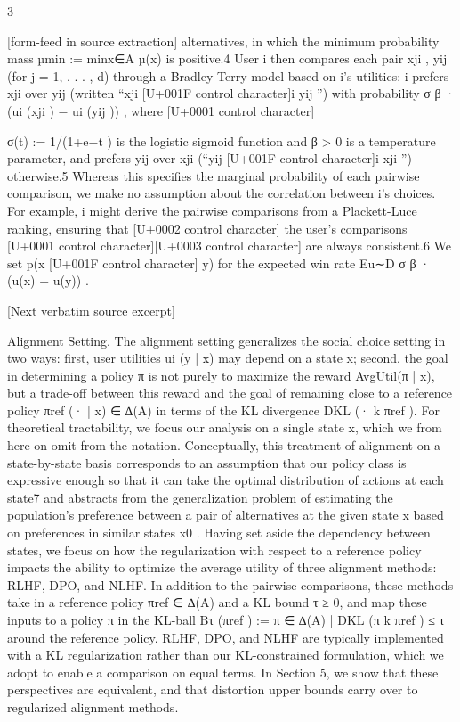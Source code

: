\documentclass[10pt]{article}
\begin{document}
\begin{ReviewVerbatim}
                                                           3

[form-feed in source extraction]
alternatives, in which the minimum probability mass µmin := minx∈A µ(x) is positive.4 User i
then compares each pair {xji , yij } (for j = 1, . . . , d) through a Bradley-Terry model based on i’s
utilities: i prefers xji over yij (written “xji [U+001F control character]i yij ”) with probability σ β · (ui (xji ) − ui (yij )) , where
                                                                                                        [U+0001 control character]

σ(t) := 1/(1+e−t ) is the logistic sigmoid function and β > 0 is a temperature parameter, and prefers
yij over xji (“yij [U+001F control character]i xji ”) otherwise.5 Whereas this specifies the marginal probability of each pairwise
comparison, we make no assumption about the correlation between i’s choices. For example, i might
derive the pairwise comparisons from a Plackett-Luce ranking, ensuring that      [U+0002 control character] the user’s comparisons  [U+0001 control character][U+0003 control character]
are always consistent.6 We set p(x [U+001F control character] y) for the expected win rate Eu∼D σ β · (u(x) − u(y)) .

[Next verbatim source excerpt]

Alignment Setting. The alignment setting generalizes the social choice setting in two ways: first,
user utilities ui (y | x) may depend on a state x; second, the goal in determining a policy π is not
purely to maximize the reward AvgUtil(π | x), but a trade-off between this reward and the goal of
remaining close to a reference policy πref (· | x) ∈ ∆(A) in terms of the KL divergence DKL (· k πref ).
For theoretical tractability, we focus our analysis on a single state x, which we from here on omit
from the notation. Conceptually, this treatment of alignment on a state-by-state basis corresponds to
an assumption that our policy class is expressive enough so that it can take the optimal distribution of
actions at each state7 and abstracts from the generalization problem of estimating the population’s
preference between a pair of alternatives at the given state x based on preferences in similar states x0 .
Having set aside the dependency between states, we focus on how the regularization with respect
to a reference policy impacts the ability to optimize the average utility of three alignment methods:
RLHF, DPO, and NLHF. In addition to the pairwise comparisons, these methods take in a reference
policy πref ∈ ∆(A) and a KL bound τ ≥ 0, and map these inputs to a policy π in the KL-ball
Bτ (πref ) := {π ∈ ∆(A) | DKL (π k πref ) ≤ τ } around the reference policy. RLHF, DPO, and NLHF
are typically implemented with a KL regularization rather than our KL-constrained formulation,
which we adopt to enable a comparison on equal terms. In Section 5, we show that these perspectives
are equivalent, and that distortion upper bounds carry over to regularized alignment methods.


\end{ReviewVerbatim}
\end{document}
